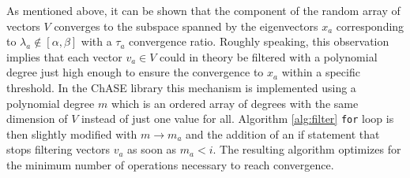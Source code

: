 As mentioned above, it can be shown that the component of the random array of vectors $V$ converges to the subspace spanned by the eigenvectors $x_a$ corresponding to $\lambda_a \notin[\alpha,\beta]$ with a $\tau_a$ convergence ratio. Roughly speaking, this observation implies that each vector $v_a \in V$ could in theory be filtered with a polynomial degree just high enough to ensure the convergence to $x_a$ within a specific threshold. In the ChASE library this mechanism is implemented using a polynomial degree $m$ which is an ordered array of degrees with the same dimension of $V$ instead of just one value for all. Algorithm \ref{alg:filter} {\tt for} loop is then slightly modified with $m \rightarrow m_a$ and the addition of an if statement that stops filtering vectors $v_a$ as soon as $m_a < i$. The resulting algorithm optimizes for the minimum number of operations necessary to reach convergence. 

